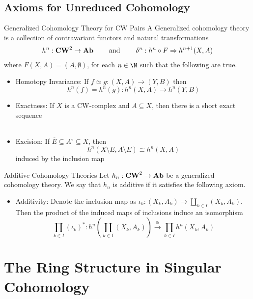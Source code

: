 \documentclass[a4paper]{article}
\begin{document}
\subsection{Axioms for Unreduced Cohomology}
\begin{defn}{Generalized Cohomology Theory for CW Pairs}{} A Generalized cohomology theory is a collection of contravariant functors and natural transformations $$h^n:\bold{CW}^2\to\bold{Ab}\;\;\;\;\;\;\;\text{ and }\;\;\;\;\;\;\;\delta^n:h^n\circ F\Rightarrow h^{n+1}(X,A)$$ where $F(X,A)=(A,\emptyset)$, for each $n\in\N$ such that the following are true. 
\begin{itemize}
\item Homotopy Invariance: If $f\simeq g:(X,A)\to(Y,B)$ then $$h^n(f)=h^n(g):h^n(X,A)\to h^n(Y,B)$$
\item Exactness: If $X$ is a CW-complex and $A\subseteq X$, then there is a short exact sequence \\
\\
\item Excision: If $\overline{E}\subseteq A^\circ\subseteq X$, then $$h^n(X\setminus E,A\setminus E)\cong h^n(X,A)$$ induced by the inclusion map
\end{itemize}
\end{defn}

\begin{defn}{Additive Cohomology Theories}{} Let $h_n:\bold{CW}^2\to\bold{Ab}$ be a generalized cohomology theory. We say that $h_n$ is additive if it satisfies the following axiom. 
\begin{itemize}
\item Additivity: Denote the inclusion map as $\iota_k:(X_k,A_k)\to\coprod_{k\in I}(X_k,A_k)$. Then the product of the induced maps of inclusions induce an isomorphism $$\prod_{k\in I}(\iota_k)^\ast:h^n\left(\coprod_{k\in I}(X_k,A_k)\right)\overset{\cong}{\longrightarrow}\prod_{k\in I}h^n(X_k,A_k)$$
\end{itemize}
\end{defn}

\pagebreak
\section{The Ring Structure in Singular Cohomology}
\end{document}
